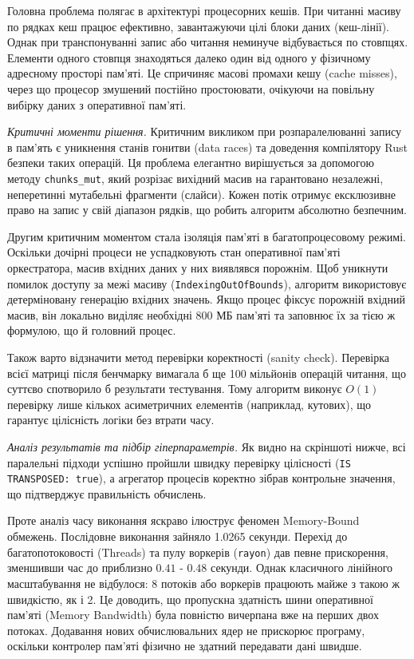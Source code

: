 \documentclass[14pt, a4paper]{extreport}
\begin{document}
	Головна проблема полягає в архітектурі процесорних кешів. При читанні масиву по рядках кеш працює ефективно, завантажуючи цілі блоки даних (кеш-лінії). Однак при транспонуванні запис або читання неминуче відбувається по стовпцях. Елементи одного стовпця знаходяться далеко один від одного у фізичному адресному просторі пам'яті. Це спричиняє масові промахи кешу (cache misses), через що процесор змушений постійно простоювати, очікуючи на повільну вибірку даних з оперативної пам'яті. 
	
	\textit{Критичні моменти рішення.}
	Критичним викликом при розпаралелюванні запису в пам'ять є уникнення станів гонитви (data races) та доведення компілятору Rust безпеки таких операцій. Ця проблема елегантно вирішується за допомогою методу \texttt{chunks\_mut}, який розрізає вихідний масив на гарантовано незалежні, неперетинні мутабельні фрагменти (слайси). Кожен потік отримує ексклюзивне право на запис у свій діапазон рядків, що робить алгоритм абсолютно безпечним.
	
	Другим критичним моментом стала ізоляція пам'яті в багатопроцесовому режимі. Оскільки дочірні процеси не успадковують стан оперативної пам'яті оркестратора, масив вхідних даних у них виявлявся порожнім. Щоб уникнути помилок доступу за межі масиву (\texttt{IndexingOutOfBounds}), алгоритм використовує детерміновану генерацію вхідних значень. Якщо процес фіксує порожній вхідний масив, він локально виділяє необхідні 800 МБ пам'яті та заповнює їх за тією ж формулою, що й головний процес.
	
	Також варто відзначити метод перевірки коректності (sanity check). Перевірка всієї матриці після бенчмарку вимагала б ще 100 мільйонів операцій читання, що суттєво спотворило б результати тестування. Тому алгоритм виконує $O(1)$ перевірку лише кількох асиметричних елементів (наприклад, кутових), що гарантує цілісність логіки без втрати часу.
	
	\textit{Аналіз результатів та підбір гіперпараметрів.}
	Як видно на скріншоті нижче, всі паралельні підходи успішно пройшли швидку перевірку цілісності (\texttt{IS TRANSPOSED: true}), а агрегатор процесів коректно зібрав контрольне значення, що підтверджує правильність обчислень.
	
	
	Проте аналіз часу виконання яскраво ілюструє феномен Memory-Bound обмежень. Послідовне виконання зайняло 1.0265 секунди. Перехід до багатопотоковості (Threads) та пулу воркерів (\texttt{rayon}) дав певне прискорення, зменшивши час до приблизно $0.41$ - $0.48$ секунди. Однак класичного лінійного масштабування не відбулося: 8 потоків або воркерів працюють майже з такою ж швидкістю, як і 2. Це доводить, що пропускна здатність шини оперативної пам'яті (Memory Bandwidth) була повністю вичерпана вже на перших двох потоках. Додавання нових обчислювальних ядер не прискорює програму, оскільки контролер пам'яті фізично не здатний передавати дані швидше. 
	
\end{document}
